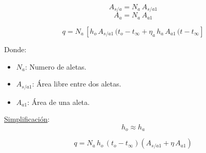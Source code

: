 \begin{equation*}
    A_{s/a} = N_a\,A_{s/a1}
\end{equation*}
\begin{equation*}
    A_{a} = N_a\,A_{a1}
\end{equation*}

\begin{equation*}
    q = N_a\,[h_o\,A_{s/a1}\,(t_o - t_{\infty} + \eta_a\,h_a\,A_{a1}\,(t - t_{\infty}]
\end{equation*}

Donde:
\begin{itemize}
    \item $N_a$: Numero de aletas.
    \item $A_{s/a1}$: Área libre entre dos aletas.
    \item $A_{a1}$: Área de una aleta.
\end{itemize}

\underline{Simplificación}:
\begin{equation*}
    h_o \approx h_a
\end{equation*}

\begin{equation*}
    q = N_a\,h_o\,(t_o - t_{\infty})(A_{s/a1} + \eta\,A_{a1})
\end{equation*}

